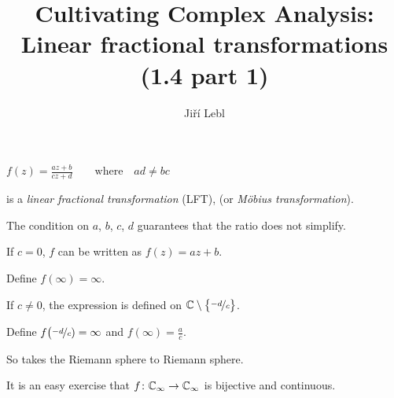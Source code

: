 \documentclass[10pt,aspectratio=169]{beamer}
\author{Ji\v{r}\'i Lebl}
\institute[OSU]{%
Departemento pri Matematiko de Oklahoma {\^S}tata Universitato}
\title{Cultivating Complex Analysis:\\%
Linear fractional transformations (1.4 part 1)}
\date{}
\begin{document}
\begin{frame}
\titlepage
\end{frame}

\begin{frame}
$\displaystyle
f(z) = \frac{a z + b}{c z + d}
\qquad \text{where} \quad ad \not= bc
$
\medskip

is a \emph{linear fractional transformation} (LFT), (or \emph{M\"obius
transformation}).

\medskip
\pause

The condition on $a$, $b$, $c$, $d$ guarantees that the ratio does not
simplify.

\medskip
\pause

If $c=0$, $f$ can be written as $f(z)=az+b$.

\medskip

Define $f(\infty) = \infty$.

\medskip
\pause

If $c\not=0$, the expression is defined on
${\mathbb{C}} \setminus \bigl\{ \nicefrac{-d}{c} \bigr\}$.

\medskip

Define $f\bigl(\nicefrac{-d}{c}) = \infty$ and 
$f(\infty) = \frac{a}{c}$.

\medskip
\pause

So takes the Riemann sphere to Riemann sphere.

\medskip

It is an easy exercise that $f \colon {\mathbb{C}}_\infty \to {\mathbb{C}}_\infty$ is bijective and continuous.

\end{frame}
\end{document}
